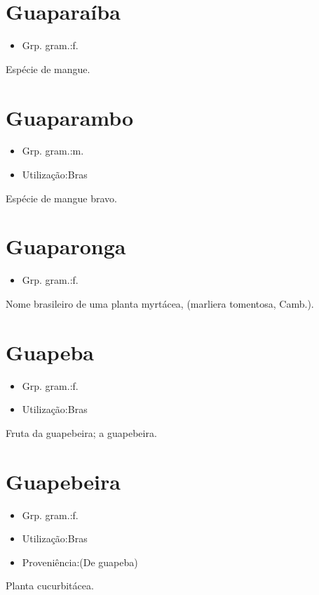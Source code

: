 \section{Guaparaíba}
\begin{itemize}
\item {Grp. gram.:f.}
\end{itemize}
Espécie de mangue.
\section{Guaparambo}
\begin{itemize}
\item {Grp. gram.:m.}
\end{itemize}
\begin{itemize}
\item {Utilização:Bras}
\end{itemize}
Espécie de mangue bravo.
\section{Guaparonga}
\begin{itemize}
\item {Grp. gram.:f.}
\end{itemize}
Nome brasileiro de uma planta myrtácea, (\textunderscore marliera tomentosa\textunderscore , Camb.).
\section{Guapeba}
\begin{itemize}
\item {Grp. gram.:f.}
\end{itemize}
\begin{itemize}
\item {Utilização:Bras}
\end{itemize}
Fruta da guapebeira; a guapebeira.
\section{Guapebeira}
\begin{itemize}
\item {Grp. gram.:f.}
\end{itemize}
\begin{itemize}
\item {Utilização:Bras}
\end{itemize}
\begin{itemize}
\item {Proveniência:(De \textunderscore guapeba\textunderscore )}
\end{itemize}
Planta cucurbitácea.
